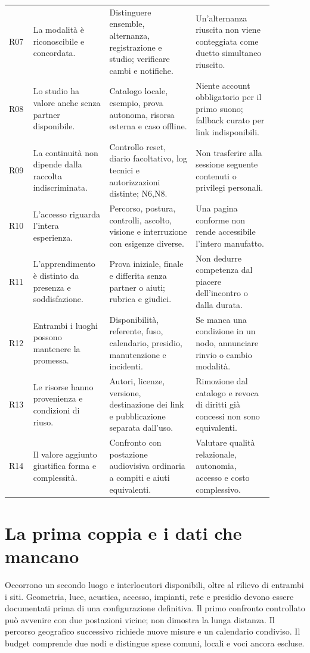 \begin{longtable}{P{0.06\linewidth}P{0.25\linewidth}P{0.30\linewidth}P{0.27\linewidth}}
R07 & La modalità è riconoscibile e concordata. & Distinguere ensemble, alternanza, registrazione e studio; verificare cambi e notifiche. & Un'alternanza riuscita non viene conteggiata come duetto simultaneo riuscito. \\\addlinespace
R08 & Lo studio ha valore anche senza partner disponibile. & Catalogo locale, esempio, prova autonoma, risorsa esterna e caso offline. & Niente account obbligatorio per il primo suono; fallback curato per link indisponibili. \\\addlinespace
R09 & La continuità non dipende dalla raccolta indiscriminata. & Controllo reset, diario facoltativo, log tecnici e autorizzazioni distinte; N6,N8. & Non trasferire alla sessione seguente contenuti o privilegi personali. \\\addlinespace
R10 & L'accesso riguarda l'intera esperienza. & Percorso, postura, controlli, ascolto, visione e interruzione con esigenze diverse. & Una pagina conforme non rende accessibile l'intero manufatto. \\\addlinespace
R11 & L'apprendimento è distinto da presenza e soddisfazione. & Prova iniziale, finale e differita senza partner o aiuti; rubrica e giudici. & Non dedurre competenza dal piacere dell'incontro o dalla durata. \\\addlinespace
R12 & Entrambi i luoghi possono mantenere la promessa. & Disponibilità, referente, fuso, calendario, presidio, manutenzione e incidenti. & Se manca una condizione in un nodo, annunciare rinvio o cambio modalità. \\\addlinespace
R13 & Le risorse hanno provenienza e condizioni di riuso. & Autori, licenze, versione, destinazione dei link e pubblicazione separata dall'uso. & Rimozione dal catalogo e revoca di diritti già concessi non sono equivalenti. \\\addlinespace
R14 & Il valore aggiunto giustifica forma e complessità. & Confronto con postazione audiovisiva ordinaria a compiti e aiuti equivalenti. & Valutare qualità relazionale, autonomia, accesso e costo complessivo. \\
\bottomrule
\end{longtable}
\normalsize

\section{La prima coppia e i dati che mancano}
Occorrono un secondo luogo e interlocutori disponibili, oltre al rilievo di entrambi i siti. Geometria, luce, acustica, accesso, impianti, rete e presidio devono essere documentati prima di una configurazione definitiva. Il primo confronto controllato può avvenire con due postazioni vicine; non dimostra la lunga distanza. Il percorso geografico successivo richiede nuove misure e un calendario condiviso. Il budget comprende due nodi e distingue spese comuni, locali e voci ancora escluse.

